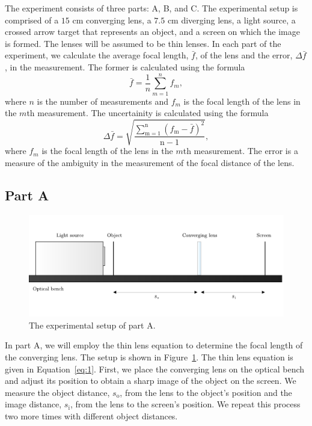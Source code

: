 \documentclass[10pt]{article}
\begin{document}
The experiment consists of three parts: A, B, and C. The experimental setup is comprised of a $15$ cm converging lens, a $7.5$ cm diverging lens, a light source, a crossed arrow target that represents an object, and a screen on which the image is formed. The lenses will be assumed to be thin lenses. In each part of the experiment, we calculate the average focal length, $\bar{f}$, of the lens and the error, $\Delta \bar{f}$, in the measurement. The former is calculated using the formula
\begin{equation}
  \bar{f} = \dfrac{1}{n} \sum_{m=1}^{n} f_{m},
\end{equation}
where $n$ is the number of measurements and $f_{m}$ is the focal length of the lens in the $m$th measurement. The uncertainity is calculated using the formula
\begin{equation}
  \Delta \bar{f} = \sqrt{\dfrac{\sum_{\mathrm{m}=1}^{\mathrm{n}} (f_\mathrm{m} - \bar{f})^2}{\mathrm{n}-1}},
\end{equation}
where $f_m$ is the focal length of the lens in the $m$th measurement. The error is a measure of the ambiguity in the measurement of the focal distance of the lens.

\subsection*{Part A}

\begin{figure}[hbt!]
  \centering
  \includegraphics[scale=0.5]{figures/f3.pdf}
  \caption{The experimental setup of part A.}
  \label{fig:3}
\end{figure}

In part A, we will employ the thin lens equation to determine the focal length of the converging lens. The setup is shown in Figure~\ref{fig:3}. The thin lens equation is given in Equation~\ref{eq:1}. First, we place the converging lens on the optical bench and adjust its position to obtain a sharp image of the object on the screen. We measure the object distance, $s_{\text{o}}$, from the lens to the object's position and the image distance, $s_{\text{i}}$, from the lens to the screen's position. We repeat this process two more times with different object distances.
\end{document}
